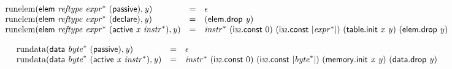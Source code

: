 \vspace{1ex}

$$
\begin{array}{@{}lcl@{}l@{}}
{\mathrm{runelem}}(\mathsf{elem}~{\mathit{reftype}}~{{\mathit{expr}}^\ast}~(\mathsf{passive}), {\mathit{y}}) &=& \epsilon &  \\
{\mathrm{runelem}}(\mathsf{elem}~{\mathit{reftype}}~{{\mathit{expr}}^\ast}~(\mathsf{declare}), {\mathit{y}}) &=& (\mathsf{elem.drop}~{\mathit{y}}) &  \\
{\mathrm{runelem}}(\mathsf{elem}~{\mathit{reftype}}~{{\mathit{expr}}^\ast}~(\mathsf{active}~{\mathit{x}}~{{\mathit{instr}}^\ast}), {\mathit{y}}) &=& {{\mathit{instr}}^\ast}~(\mathsf{i{\scriptstyle32}}.\mathsf{const}~0)~(\mathsf{i{\scriptstyle32}}.\mathsf{const}~{|{{\mathit{expr}}^\ast}|})~(\mathsf{table.init}~{\mathit{x}}~{\mathit{y}})~(\mathsf{elem.drop}~{\mathit{y}}) &  \\
\end{array}
$$

$$
\begin{array}{@{}lcl@{}l@{}}
{\mathrm{rundata}}(\mathsf{data}~{{\mathit{byte}}^\ast}~(\mathsf{passive}), {\mathit{y}}) &=& \epsilon &  \\
{\mathrm{rundata}}(\mathsf{data}~{{\mathit{byte}}^\ast}~(\mathsf{active}~{\mathit{x}}~{{\mathit{instr}}^\ast}), {\mathit{y}}) &=& {{\mathit{instr}}^\ast}~(\mathsf{i{\scriptstyle32}}.\mathsf{const}~0)~(\mathsf{i{\scriptstyle32}}.\mathsf{const}~{|{{\mathit{byte}}^\ast}|})~(\mathsf{memory.init}~{\mathit{x}}~{\mathit{y}})~(\mathsf{data.drop}~{\mathit{y}}) &  \\
\end{array}
$$

